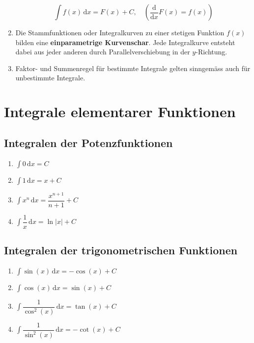 \begin{enumerate}[$(a)$]
\begin{equation}
\boxed{\displaystyle \int f\left(x\right)\,\text{d}x=F\left(x\right)+C,\quad \left(\dfrac{\text{d}}{\text{d}x}F\left(x\right)=f\left(x\right)\right)}
\end{equation}
\item Die Stammfunktionen oder Integralkurven zu einer stetigen Funktion $f\left(x\right)$ bilden eine \textbf{einparametrige Kurvenschar}. Jede Integralkurve entsteht dabei aus jeder anderen durch Parallelverschiebung in der $y$-Richtung.
\item Faktor- und Summenregel für bestimmte Integrale gelten sinngemäss auch für unbestimmte Integrale.
\end{enumerate}
\section{Integrale elementarer Funktionen}
\subsection{Integralen der Potenzfunktionen}
\begin{enumerate}[$(a)$]
\item $\displaystyle \int 0\,\text{d}x=C$
\item $\displaystyle \int 1\,\text{d}x=x+C$
\item $\displaystyle \int x^n\,\text{d}x=\dfrac{x^{n+1}}{n+1}+C$
\item $\displaystyle \int \dfrac{1}{x}\,\text{d}x=\ln\Big\vert x\Big\vert+C$
\end{enumerate}
\subsection{Integralen der trigonometrischen Funktionen}
\begin{enumerate}[$(a)$]
\item $\displaystyle \int \sin\left(x\right)\,\text{d}x=-\cos\left(x\right)+C$
\item $\displaystyle \int \cos\left(x\right)\,\text{d}x=\sin\left(x\right)+C$
\item $\displaystyle \int \dfrac{1}{\cos^2\left(x\right)}\,\text{d}x=\tan\left(x\right)+C$
\item $\displaystyle \int \dfrac{1}{\sin^2\left(x\right)}\,\text{d}x=-\cot\left(x\right)+C$
\end{enumerate}
